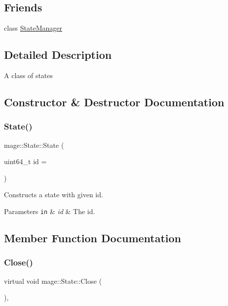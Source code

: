 \subsection*{Friends}
\begin{DoxyCompactItemize}
\item 
class \hyperlink{classmage_1_1_state_a8055e77bf0267832ef337718a11fec0d}{State\+Manager}
\end{DoxyCompactItemize}


\subsection{Detailed Description}
A class of states 

\subsection{Constructor \& Destructor Documentation}
\hypertarget{classmage_1_1_state_ac21bb6de22bb3b9c1b18d98b53e92100}{}\label{classmage_1_1_state_ac21bb6de22bb3b9c1b18d98b53e92100} 
\subsubsection{\texorpdfstring{State()}{State()}}
{\footnotesize\ttfamily mage\+::\+State\+::\+State (\begin{DoxyParamCaption}\item[{uint64\+\_\+t}]{id = {} }\end{DoxyParamCaption})}

Constructs a state with given id.


\begin{DoxyParams}[1]{Parameters}
\mbox{\tt in}  & {\em id} & The id. \\
\hline
\end{DoxyParams}


\subsection{Member Function Documentation}
\hypertarget{classmage_1_1_state_a1edd5d756566f5b689c7a381f4e6b301}{}\label{classmage_1_1_state_a1edd5d756566f5b689c7a381f4e6b301} 
\subsubsection{\texorpdfstring{Close()}{Close()}}
{\footnotesize\ttfamily virtual void mage\+::\+State\+::\+Close (\begin{DoxyParamCaption}{ }\end{DoxyParamCaption})\hspace{0.3cm}{\ttfamily [protected]}, {\ttfamily [virtual]}}

